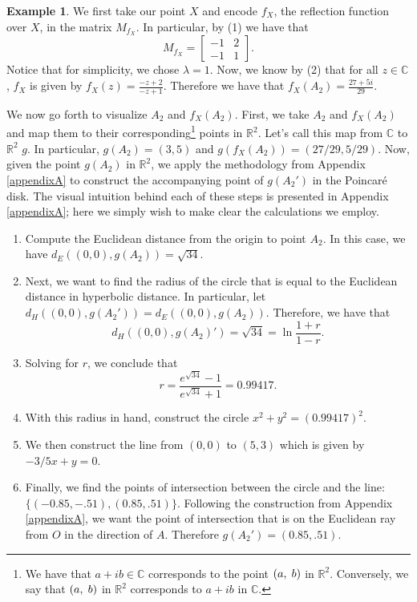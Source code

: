 \documentclass[12pt]{article}
\newcommand{\R}{\mathbb{R}}
\newcommand{\C}{\mathbb{C}}
\newcommand{\lftmat}[4]{\begin{bmatrix} {#1} & {#2} \\ {#3} & {#4} \end{bmatrix}}
\newcommand{\ttc}{, \hspace{1mm}}
\newcommand{\poincare}{Poincar\'{e} }
\theoremstyle{plain}
\theoremstyle{definition}
\newtheorem{example}[theorem]{Example}
\begin{document}
\begin{example}
We first take our point $X$ and encode $f_X$, the reflection function over $X$, in the matrix $M_{f_X}$. In particular, by (1) we have that 
\[M_{f_X} = \lftmat{-1}{2}{-1}{1}.\]
Notice that for simplicity, we chose $\lambda = 1$. Now, we know by (2) that for all $z \in \C$, $f_X$ is given by $f_X(z) = \frac{-z+2}{-z+1}$. Therefore we have that $f_X(A_2) = \frac{27+5i}{29}$. 

We now go forth to visualize $A_2$ and $f_X(A_2)$. First, we take $A_2$ and $f_X(A_2)$ and map them to their corresponding\footnote{We have that $a + ib \in \C$ corresponds to the point $(a\ttc b)$ in $\R^2$. Conversely, we say that $(a\ttc b)$ in $\R^2$ corresponds to $a+ib$ in $\C$.} points in $\R^2$. Let's call this map from $\C$ to $\R^2$ $g$. In particular, $g(A_2) = (3,5)$ and $g(f_X(A_2)) = (27/29, 5/29)$. Now, given the point $g(A_2)$ in $\R^2$, we apply the methodology from Appendix \ref{appendixA} to construct the accompanying point of $g(A_2')$ in the \poincare disk. The visual intuition behind each of these steps is presented in Appendix \ref{appendixA}; here we simply wish to make clear the calculations we employ. 

\begin{enumerate}
	\item Compute the Euclidean distance from the origin to point $A_2$. In this case, we have $d_E((0,0),g(A_2)) = \sqrt{34}$.
	\item Next, we want to find the radius of the circle that is equal to the Euclidean distance in hyperbolic distance. In particular, let $d_H((0,0), g(A_2')) = d_E((0,0), g(A_2))$. Therefore, we have that
	\[
		d_H((0,0), g(A_2)') = \sqrt{34} = \ln\frac{1 + r}{1 - r}.
	\]
	\item Solving for $r$, we conclude that 
	\[
		r = \frac{e^{\sqrt{34}} - 1}{e^{\sqrt{34}} + 1} = 0.99417.
	\]
	\item With this radius in hand, construct the circle $x^2 + y^2 = (0.99417)^2$.
	\item We then construct the line from $(0,0)$ to $(5,3)$ which is given by $-3/5x + y = 0$. 
	\item Finally, we find the points of intersection between the circle and the line: $\{(-0.85,-.51),(0.85,.51)\}$. Following the construction from Appendix \ref{appendixA}, we want the point of intersection that is on the Euclidean ray from $O$ in the direction of $A$. Therefore $g(A_2') = (0.85, .51)$. 
\end{enumerate}


\end{example}
\end{document}
